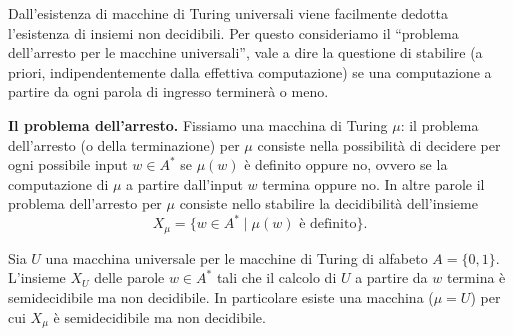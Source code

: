 Dall'esistenza di macchine di Turing universali viene facilmente dedotta l'esistenza di insiemi non decidibili. Per questo consideriamo il ``problema dell'arresto per le macchine universali'', vale a dire la questione di stabilire (a priori, indipendentemente dalla effettiva computazione) se una computazione a partire da ogni parola di ingresso terminerà o meno.

\medskip
\noindent\textbf{Il problema dell'arresto.}
Fissiamo una macchina di Turing $\mu$: il problema dell'arresto (o della terminazione) per $\mu$ consiste nella possibilità di decidere per ogni possibile input $w\in A^*$ se $\mu(w)$ è definito oppure no, ovvero se la computazione di $\mu$ a partire dall'input $w$ termina oppure no. In altre parole il problema dell'arresto per $\mu$ consiste nello stabilire la decidibilità dell'insieme
\[
X_\mu=\{w\in A^*\mid\mu(w)\text{ è definito}\}.
\]

\begin{prop}
Sia $U$ una macchina universale per le macchine di Turing di alfabeto $A=\{0,1\}$. L'insieme $X_U$ delle parole $w\in A^*$ tali che il calcolo di $U$ a partire da $w$ termina è semidecidibile ma non decidibile. In particolare esiste una macchina ($\mu=U$) per cui $X_\mu$ è semidecidibile ma non decidibile.
\end{prop}

